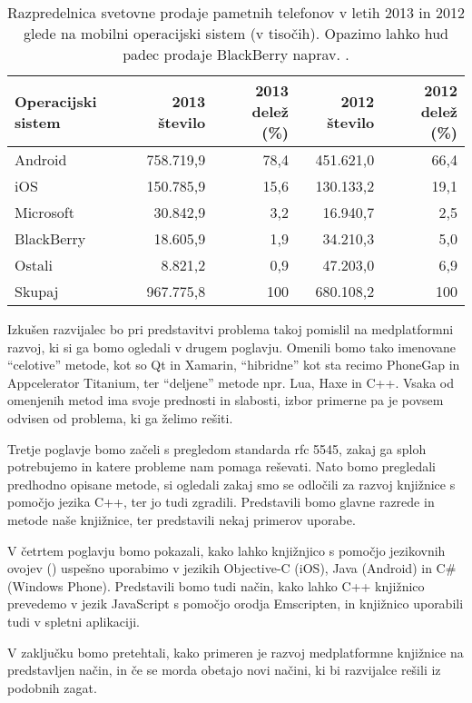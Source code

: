 \begin{table}
\begin{tabular}{ l | r | r | r | r }
  \hline
  Operacijski sistem & 2013 število & 2013 delež (\%) & 2012 število & 2012 delež (\%) \\
  \hline
  Android		& 758.719,9 & 78,4 & 451.621,0 & 66,4 \\
  iOS			& 150.785,9 & 15,6 & 130.133,2 & 19,1 \\
  Microsoft		& 30.842,9  & 3,2  & 16.940,7  & 2,5  \\
  BlackBerry	& 18.605,9  & 1,9  & 34.210,3  & 5,0  \\
  Ostali		& 8.821,2   & 0,9  & 47.203,0  & 6,9  \\
  \hline
  Skupaj		& 967.775,8 & 100  & 680.108,2 & 100  \\
  \hline
\end{tabular}
\caption{Razpredelnica svetovne prodaje pametnih telefonov v letih 2013 in 2012 glede na mobilni operacijski sistem (v tisočih). Opazimo lahko hud padec prodaje BlackBerry naprav. \cite{gartner-mobile-numbers}.}
\label{table:prodaja-mobilnih-naprav}
\end{table}

Izkušen razvijalec bo pri predstavitvi problema takoj pomislil na medplatformni razvoj, ki si ga bomo ogledali v drugem poglavju. Omenili bomo tako imenovane ``celotive'' metode, kot so Qt\cite{qt} in Xamarin\cite{xamarin}, ``hibridne'' kot sta recimo PhoneGap\cite{phonegap} in Appcelerator Titanium\cite{titanium}, ter ``deljene'' metode npr. Lua\cite{lua}, Haxe\cite{haxe} in C++\cite{cpp}. Vsaka od omenjenih metod ima svoje prednosti in slabosti, izbor primerne pa je povsem odvisen od problema, ki ga želimo rešiti.

Tretje poglavje bomo začeli s pregledom standarda \gls{rfc} 5545\cite{rfc5545}, zakaj ga sploh potrebujemo in katere probleme nam pomaga reševati. Nato bomo pregledali predhodno opisane metode, si ogledali zakaj smo se odločili za razvoj knjižnice s pomočjo jezika C++, ter jo tudi zgradili. Predstavili bomo glavne razrede in metode naše knjižnice, ter predstavili nekaj primerov uporabe.

V četrtem poglavju bomo pokazali, kako lahko knjižnjico s pomočjo jezikovnih ovojev () uspešno uporabimo v jezikih Objective-C (iOS), Java (Android) in C\# (Windows Phone). Predstavili bomo tudi način, kako lahko C++ knjižnico prevedemo v jezik JavaScript s pomočjo orodja Emscripten\cite{emscripten}, in knjižnico uporabili tudi v spletni aplikaciji.

V zaključku bomo pretehtali, kako primeren je razvoj medplatformne knjižnice na predstavljen način, in če se morda obetajo novi načini, ki bi razvijalce rešili iz podobnih zagat.
